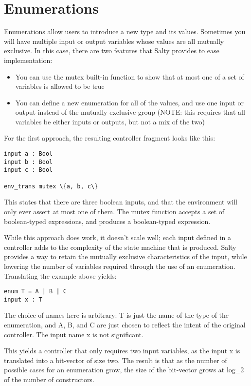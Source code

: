 \section{Enumerations}

Enumerations allow users to introduce a new type and its values. Sometimes you will have multiple input or output variables whose values are all mutually exclusive. In this case, there are two features that Salty provides to ease implementation:

\begin{itemize}

\item You can use the mutex built-in function to show that at most one of a set of variables is allowed to be true
\item You can define a new enumeration for all of the values, and use one input or output instead of the mutually exclusive group (NOTE: this requires that all variables be either inputs or outputs, but not a mix of the two)
\end{itemize}

For the first approach, the resulting controller fragment looks like this:

\begin{lstlisting}
input a : Bool
input b : Bool
input c : Bool

env_trans mutex \{a, b, c\}
\end{lstlisting}

This states that there are three boolean inputs, and that the environment will only ever assert at most one of them. The mutex function accepts a set of boolean-typed expressions, and produces a boolean-typed expression.

While this approach does work, it doesn't scale well; each input defined in a controller adds to the complexity of the state machine that is produced. Salty provides a way to retain the mutually exclusive characteristics of the input, while lowering the number of variables required through the use of an enumeration. Translating the example above yields:
\begin{lstlisting}
enum T = A | B | C
input x : T
\end{lstlisting}
The choice of names here is arbitrary: T is just the name of the type of the enumeration, and A, B, and C are just chosen to reflect the intent of the original controller. The input name x is not significant.

This yields a controller that only requires two input variables, as the input x is translated into a bit-vector of size two. The result is that as the number of possible cases for an enumeration grow, the size of the bit-vector grows at log\_2 of the number of constructors.\begin{lstlisting}
\end{lstlisting}

